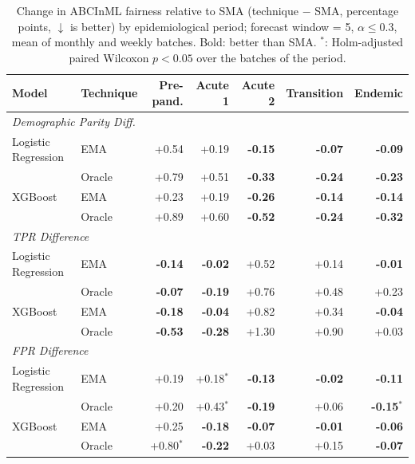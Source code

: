 \begin{table}
  \small
  \caption{Change in ABCInML fairness relative to SMA (technique $-$ SMA, percentage points, $\downarrow$ is better) by epidemiological period; forecast window = 5, $\alpha \leq 0.3$, mean of monthly and weekly batches. Bold: better than SMA. $^{*}$: Holm-adjusted paired Wilcoxon $p<0.05$ over the batches of the period.}
  \label{tab:forecasting-delta-period}
  \begin{tabular}{llrrrrr}
    \toprule
    Model & Technique & Pre-pand. & Acute 1 & Acute 2 & Transition & Endemic \\
    \midrule
    \multicolumn{7}{l}{\textit{Demographic Parity Diff.}} \\
    Logistic Regression & EMA & +0.54 & +0.19 & \textbf{-0.15} & \textbf{-0.07} & \textbf{-0.09} \\
     & Oracle & +0.79 & +0.51 & \textbf{-0.33} & \textbf{-0.24} & \textbf{-0.23} \\
    XGBoost & EMA & +0.23 & +0.19 & \textbf{-0.26} & \textbf{-0.14} & \textbf{-0.14} \\
     & Oracle & +0.89 & +0.60 & \textbf{-0.52} & \textbf{-0.24} & \textbf{-0.32} \\
    \midrule
    \multicolumn{7}{l}{\textit{TPR Difference}} \\
    Logistic Regression & EMA & \textbf{-0.14} & \textbf{-0.02} & +0.52 & +0.14 & \textbf{-0.01} \\
     & Oracle & \textbf{-0.07} & \textbf{-0.19} & +0.76 & +0.48 & +0.23 \\
    XGBoost & EMA & \textbf{-0.18} & \textbf{-0.04} & +0.82 & +0.34 & \textbf{-0.04} \\
     & Oracle & \textbf{-0.53} & \textbf{-0.28} & +1.30 & +0.90 & +0.03 \\
    \midrule
    \multicolumn{7}{l}{\textit{FPR Difference}} \\
    Logistic Regression & EMA & +0.19 & +0.18$^{*}$ & \textbf{-0.13} & \textbf{-0.02} & \textbf{-0.11} \\
     & Oracle & +0.20 & +0.43$^{*}$ & \textbf{-0.19} & +0.06 & \textbf{-0.15$^{*}$} \\
    XGBoost & EMA & +0.25 & \textbf{-0.18} & \textbf{-0.07} & \textbf{-0.01} & \textbf{-0.06} \\
     & Oracle & +0.80$^{*}$ & \textbf{-0.22} & +0.03 & +0.15 & \textbf{-0.07} \\
    \bottomrule
  \end{tabular}
\end{table}

